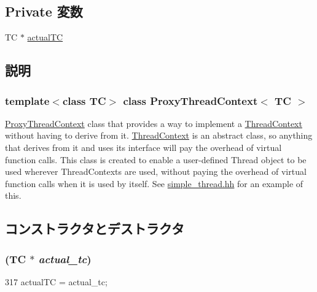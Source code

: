 \subsection*{Private 変数}
\begin{DoxyCompactItemize}
\item 
TC $\ast$ \hyperlink{classProxyThreadContext_af006a89ce9ad7b3b522cba1d69d950da}{actualTC}
\end{DoxyCompactItemize}


\subsection{説明}
\subsubsection*{template$<$class TC$>$ class ProxyThreadContext$<$ TC $>$}

\hyperlink{classProxyThreadContext}{ProxyThreadContext} class that provides a way to implement a \hyperlink{classThreadContext}{ThreadContext} without having to derive from it. \hyperlink{classThreadContext}{ThreadContext} is an abstract class, so anything that derives from it and uses its interface will pay the overhead of virtual function calls. This class is created to enable a user-\/defined Thread object to be used wherever ThreadContexts are used, without paying the overhead of virtual function calls when it is used by itself. See \hyperlink{simple__thread_8hh}{simple\_\-thread.hh} for an example of this. 

\subsection{コンストラクタとデストラクタ}
\hypertarget{classProxyThreadContext_a08a972fa4d94c52ce3128238e1f8fbfe}{
\subsubsection[{ProxyThreadContext}]{ (TC $\ast$ {\em actual\_\-tc})}}
\label{classProxyThreadContext_a08a972fa4d94c52ce3128238e1f8fbfe}



\begin{DoxyCode}
317     { actualTC = actual_tc; }
\end{DoxyCode}



